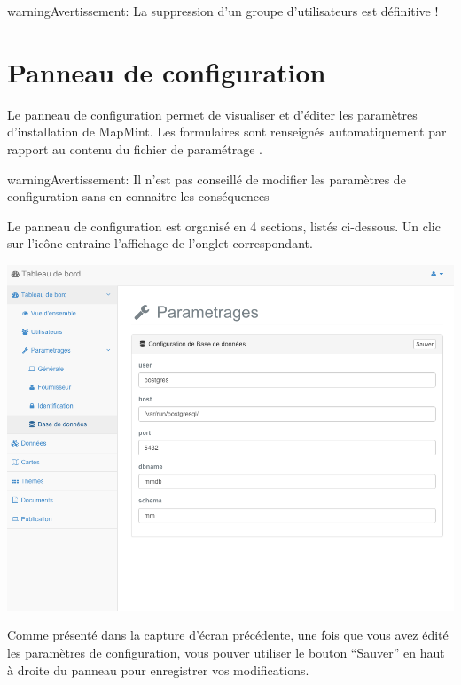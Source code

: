 \documentclass[letterpaper,10pt,french]{sphinxmanual}
\begin{document}
\begin{notice}{warning}{Avertissement:}
La suppression d'un groupe d'utilisateurs est définitive !
\end{notice}


\section{Panneau de configuration}
\label{dashboard/configuration::doc}\label{dashboard/configuration:panneau-de-configuration}\label{dashboard/configuration:dashboard-configuration}
Le panneau de configuration permet de visualiser et d'éditer les
paramètres d'installation de MapMint. Les formulaires sont renseignés
automatiquement par rapport au contenu du fichier de paramétrage
.

\begin{notice}{warning}{Avertissement:}
Il n'est pas conseillé de modifier les paramètres de configuration sans en connaitre les conséquences
\end{notice}

Le panneau de configuration est organisé en 4 sections, listés ci-dessous. Un clic sur l'icône entraine l'affichage de l'onglet correspondant.

\includegraphics[width=1.000\linewidth]{dashboard-conf-form.png}

Comme présenté dans la capture d'écran précédente, une fois que vous
avez édité les paramètres de configuration, vous pouver utiliser le
bouton ``Sauver'' en haut à droite du panneau pour enregistrer vos
modifications.
\end{document}
